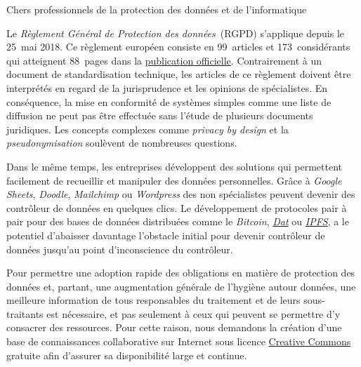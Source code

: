 \documentclass{scrlttr2}
\begin{document}



\begin{letter}{}
\opening{Chers professionnels de la protection des données et de
l'informatique}

Le \emph{Règlement Général de Protection des données}~(RGPD) s'applique
depuis le 25~mai 2018. Ce règlement européen consiste en 99~articles et
173~considérants qui atteignent 88~pages dans la
\href{http://eur-lex.europa.eu/legal-content/EN/TXT/?uri=uriserv:OJ.L_.2016.119.01.0001.01.ENG}{publication
officielle}. Contrairement à un document de standardisation technique,
les articles de ce règlement doivent être interprétés en regard de la
jurisprudence et les opinions de spécialistes. En conséquence, la mise
en conformité de systèmes simples comme une liste de diffusion ne peut
pas être effectuée sans l'étude de plusieurs documents juridiques. Les
concepts complexes comme \emph{privacy by design} et la
\emph{pseudonymisation} soulèvent de nombreuses questions.

Dans le même temps, les entreprises développent des solutions qui
permettent facilement de recueillir et manipuler des données
personnelles. Grâce à \emph{Google Sheets}, \emph{Doodle},
\emph{Mailchimp} ou \emph{Wordpress} des non spécialistes peuvent
devenir des contrôleur de données en quelques clics. Le développement de
protocoles pair à pair pour des bases de données distribuées comme le
\emph{Bitcoin}, \emph{\href{https://datproject.org/}{Dat}} ou
\emph{\href{https://ipfs.io/}{IPFS}}, a le potentiel d'abaisser
davantage l'obstacle initial pour devenir contrôleur de données jusqu'au
point d'inconscience du contrôleur.

Pour permettre une adoption rapide des obligations en matière de
protection des données et, partant, une augmentation générale de
l'hygiène autour données, une meilleure information de tous responsables
du traitement et de leurs sous-traitants est nécessaire, et pas
seulement à ceux qui peuvent se permettre d'y consacrer des ressources.
Pour cette raison, nous demandons la création d'une base de
connaissances collaborative sur Internet sous licence
\href{https://creativecommons.org/}{Creative Commons} gratuite afin
d'assurer sa disponibilité large et continue.


\end{letter}
\end{document}
